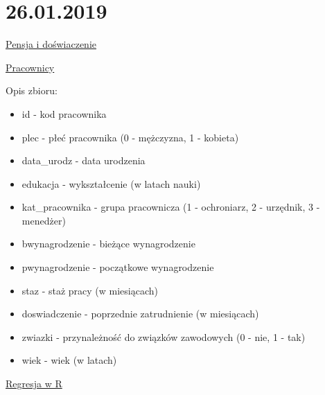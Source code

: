 \documentclass[]{book}
\providecommand{\tightlist}{%
  \setlength{\itemsep}{0pt}\setlength{\parskip}{0pt}}
\begin{document}
\section{26.01.2019}\label{section-3}

\href{data/salary.xlsx}{Pensja i doświaczenie}

\href{data/pracownicy.xlsx}{Pracownicy}

Opis zbioru:

\begin{itemize}
\tightlist
\item
  id - kod pracownika
\item
  plec - płeć pracownika (0 - mężczyzna, 1 - kobieta)
\item
  data\_urodz - data urodzenia
\item
  edukacja - wykształcenie (w latach nauki)
\item
  kat\_pracownika - grupa pracownicza (1 - ochroniarz, 2 - urzędnik, 3 -
  menedżer)
\item
  bwynagrodzenie - bieżące wynagrodzenie
\item
  pwynagrodzenie - początkowe wynagrodzenie
\item
  staz - staż pracy (w miesiącach)
\item
  doswiadczenie - poprzednie zatrudnienie (w miesiącach)
\item
  zwiazki - przynależność do związków zawodowych (0 - nie, 1 - tak)
\item
  wiek - wiek (w latach)
\end{itemize}

\href{res/regresja20190126.R}{Regresja w R}
\end{document}
